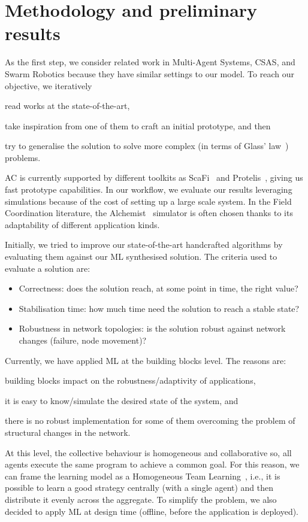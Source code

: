 \documentclass[conference]{IEEEtran}
\begin{document}
\section{Methodology and preliminary results}
%
As the first step, we consider related work in Multi-Agent Systems, CSAS, and Swarm Robotics because they have similar settings to our model.
To reach our objective, we iteratively 
\begin{enumerate*}[label=(\roman*)]
\item read works at the state-of-the-art,
\item take inspiration from one of them to craft an initial prototype, and then
\item try to generalise the solution to solve more complex (in terms of Glass' law~\cite{DBLP:journals/software/Glass01}) problems.
\end{enumerate*}

AC is currently supported by different toolkits as ScaFi~\cite{DBLP:conf/ecoop/CasadeiV16} and Protelis~\cite{DBLP:conf/sac/PianiniVB15}, giving us fast prototype capabilities.
%
In our workflow, we evaluate our results leveraging simulations because of the cost of setting up a large scale system.
%
In the Field Coordination literature, the Alchemist~\cite{alchemist-jos2013} simulator is often chosen thanks to its adaptability of different application kinds. %

Initially, we tried to improve our state-of-the-art handcrafted algorithms by evaluating them against our ML synthesised solution.
%
The criteria used to evaluate a solution are:
\begin{itemize}
    \item Correctness: does the solution reach, at some point in time, the right value?
    \item Stabilisation time: how much time need the solution to reach a stable state?
    \item Robustness in network topologies: is the solution robust against network changes (failure, node movement)?
\end{itemize}

Currently, we have applied ML at the building blocks level.
The reasons are:
\begin{enumerate*}[label=(\roman*)]
\item building blocks impact on the robustness/adaptivity of applications,
\item it is easy to know/simulate the desired state of the system, and
\item there is no robust implementation for some of them overcoming the problem of structural changes in the network.
\end{enumerate*}
%
At this level, the collective behaviour is homogeneous and collaborative so, all agents execute the same program to achieve a common goal.
%
For this reason, we can frame the learning model as a Homogeneous Team Learning~\cite{DBLP:journals/aamas/PanaitL05}, i.e., it is possible to learn a good strategy centrally (with a single agent) and then distribute it evenly across the aggregate.
%
To simplify the problem, we also decided to apply ML at design time (offline, before the application is deployed).
\end{document}
